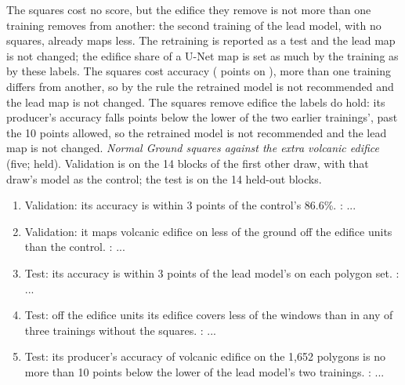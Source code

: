 The squares cost no score, but the edifice they remove is not more than one training removes from another: the
second training of the lead model, with no squares, already maps less. The retraining is reported as a test and the
lead map is not changed; the edifice share of a U-Net map is set as much by the training as by these labels.
The squares cost accuracy ( points on ), more than one training differs from another, so by
the rule the retrained model is not recommended and the lead map is not changed.
The squares remove edifice the labels do hold: its producer's accuracy falls  points below the lower of
the two earlier trainings', past the 10 points allowed, so the retrained model is not recommended and the lead map
is not changed.
\emph{Normal Ground squares against the extra volcanic edifice} (five;  held). Validation is on the
14 blocks of the first other draw, with that draw's model as the control; the test is on the 14 held-out blocks.
\begin{enumerate}
\item[E1] Validation: its accuracy is within 3 points of the control's 86.6\%. \emph{}: ...
\item[E2] Validation: it maps volcanic edifice on less of the ground off the edifice units than the control.
\emph{}: ...
\item[E3] Test: its accuracy is within 3 points of the lead model's on each polygon set. \emph{}: ...
\item[E4] Test: off the edifice units its edifice covers less of the windows than in any of three trainings without
the squares. \emph{}: ...
\item[E5] Test: its producer's accuracy of volcanic edifice on the 1,652 polygons is no more than 10 points below
the lower of the lead model's two trainings. \emph{}: ...
\end{enumerate}
